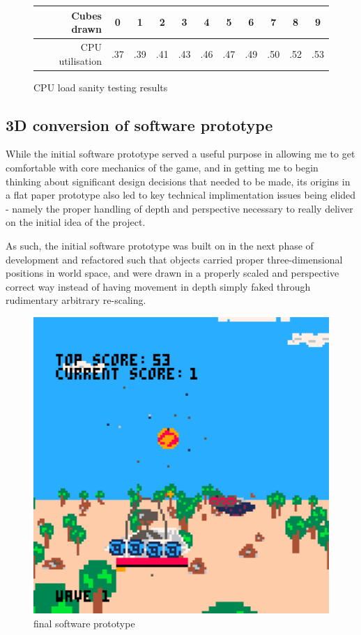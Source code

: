 \documentclass{article}
\begin{document}
\begin{figure}[h]
\begin{center}
\begin{tabular}{r|c c c c c c c c c c}
     Cubes drawn & 0 & 1 & 2 & 3 & 4 & 5 & 6 & 7 & 8 & 9 \\
     \hline
     CPU utilisation & .37 & .39 & .41 & .43 & .46 & .47 & .49 & .50 & .52 & .53
\end{tabular}
\end{center}
\caption{CPU load sanity testing results}
\label{fig:3dtest}
\end{figure}

\subsection{3D conversion of software prototype}

While the initial software prototype served a useful purpose in allowing me to get comfortable
with core mechanics of the game, and in getting me to begin thinking about significant design
decisions that needed to be made, its origins in a flat paper prototype also led to key technical
implimentation issues being elided - namely the proper handling of depth and perspective necessary
to really deliver on the initial idea of the project.

As such, the initial software prototype was built on in the next phase of development and refactored
such that objects carried proper three-dimensional positions in world space, and were drawn in a
properly scaled and perspective correct way instead of having movement in depth simply faked through
rudimentary arbitrary re-scaling.

\begin{figure}[h]
    \centering
    \includegraphics[width=.8\textwidth]{explosion}
    \caption{final software prototype}
    \label{fig:particles}
\end{figure}
\end{document}
